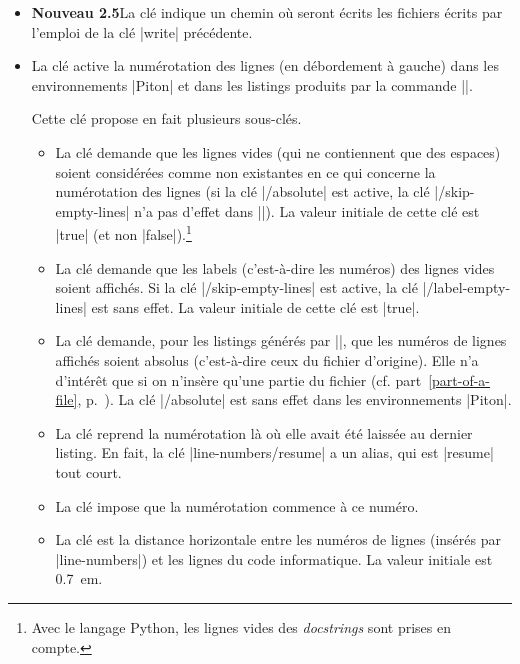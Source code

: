 \documentclass[dvipsnames,svgnames]{article}
\begin{document}
\begin{itemize}
\item {} \colorbox{yellow!50}{\bfseries Nouveau 2.5}\enskip La clé  indique
un chemin où seront écrits les fichiers écrits par l'emploi de la clé |write| précédente.

\item {} La clé  active la numérotation des lignes (en débordement à
gauche) dans les environnements |{Piton}| et dans les listings produits par la commande |\PitonInputFile|.

Cette clé propose en fait plusieurs sous-clés.
\begin{itemize}
\item La clé  demande que les lignes vides (qui ne contiennent que des
espaces) soient considérées comme non existantes en ce qui concerne la numérotation des lignes (si la clé
|/absolute| est active, la clé |/skip-empty-lines| n'a pas d'effet dans |\PitonInputFile|). La valeur initiale de
cette clé est |true| (et non |false|).\footnote{Avec le langage Python, les lignes vides des \emph{docstrings} sont
  prises en compte.}

\item La clé  demande que les labels (c'est-à-dire les numéros) des lignes vides
soient affichés. Si la clé |/skip-empty-lines| est active, la clé |/label-empty-lines| est sans effet. La
valeur initiale de cette clé est |true|.

\item La clé  demande, pour les listings générés par |\PitonInputFile|, que les numéros de
lignes affichés soient absolus (c'est-à-dire ceux du fichier d'origine). Elle n'a d'intérêt que si on n'insère qu'une
partie du fichier (cf. part~\ref{part-of-a-file}, p.~\pageref{part-of-a-file}). La clé |/absolute| est sans effet dans les environnements |{Piton}|.

\item La clé  reprend la numérotation là où elle avait été laissée au dernier listing. En fait,
la clé |line-numbers/resume| a un alias, qui est |resume| tout court. 

\item La clé  impose que la numérotation commence à ce numéro. 

\item La clé  est la distance horizontale entre les numéros de lignes (insérés par |line-numbers|)
et les lignes du code informatique. La valeur initiale est 0.7~em.
\end{itemize}


\end{itemize}
\end{document}

